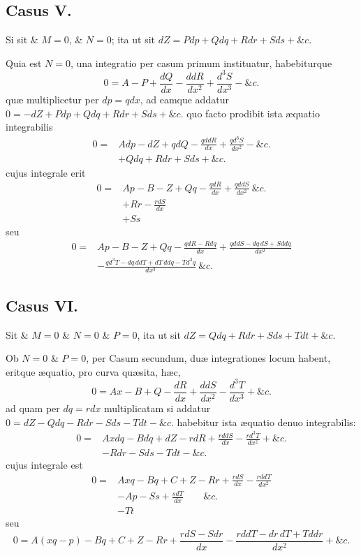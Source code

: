 \subsection*{Casus V.}
Si sit \& $M=0$, \& $N=0$; ita ut sit $dZ=Pdp+Qdq+Rdr+Sds+\&c.$

Quia est $N=0$, una integratio per casum primum instituatur, habebiturque
\[0=A-P+\frac{dQ}{dx}-\frac{ddR}{dx^2}+\frac{d^3S}{dx^3}-\&c.\]
quæ multiplicetur per $dp=qdx$, ad eamque addatur $0=-dZ+Pdp+Qdq+Rdr+Sds+\&c.$ quo facto prodibit ista æquatio integrabilis
\[\begin{aligned}
0={}&Adp-dZ+qdQ-\frac{qddR}{dx}+\frac{qd^3S}{dx^2}-\&c.\\
&+Qdq+Rdr+Sds+\&c.
\end{aligned}\]
cujus integrale erit
\[\begin{aligned}
0={}&Ap-B-Z+Qq-\frac{qdR}{dx}+\frac{qddS}{dx^2}\ \&c.\\
&+Rr-\frac{rdS}{dx}\\
&+Ss
\end{aligned}\]
seu
\[\begin{aligned}
0={}&Ap-B-Z+Qq-\frac{qdR-Rdq}{dx}+\frac{qddS-dq\,dS+Sddq}{dx^2}\\
&-\frac{qd^3T-dq\,ddT+dT\,ddq-Td^3q}{dx^3}\ \&c.
\end{aligned}\]

\subsection*{Casus VI.}
Sit \& $M=0$ \& $N=0$ \& $P=0$, ita ut sit $dZ=Qdq+Rdr+Sds+Tdt+\&c.$

Ob $N=0$ \& $P=0$, per Casum secundum, duæ integrationes locum habent, eritque æquatio, pro curva quæsita, hæc,
\[0=Ax-B+Q-\frac{dR}{dx}+\frac{ddS}{dx^2}-\frac{d^3T}{dx^3}+\&c.\]
ad quam per $dq=rdx$ multiplicatam si addatur $0=dZ-Qdq-Rdr-Sds-Tdt-\&c.$ habebitur ista æquatio denuo integrabilis:
\[\begin{aligned}
0={}&Axdq-Bdq+dZ-rdR+\frac{rddS}{dx}-\frac{rd^3T}{dx^2}+\&c.\\
&-Rdr-Sds-Tdt-\&c.
\end{aligned}\]
cujus integrale est
\[\begin{aligned}
0={}&Axq-Bq+C+Z-Rr+\frac{rdS}{dx}-\frac{rddT}{dx^2}\\
&-Ap-Ss+\frac{sdT}{dx}\qquad\&c.\\
&-Tt
\end{aligned}\]
seu
\[0=A(xq-p)-Bq+C+Z-Rr+\frac{rdS-Sdr}{dx}-\frac{rddT-dr\,dT+Tddr}{dx^2}+\&c.\]

